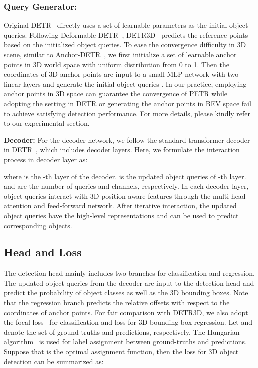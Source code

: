 \documentclass[runningheads]{llncs}
\begin{document}
\subsubsection{Query Generator:}
Original DETR~\cite{carion2020detr} directly uses a set of learnable parameters as the initial object queries. Following Deformable-DETR~\cite{zhu2020deformable}, DETR3D~\cite{wang2022detr3d} predicts the reference points based on the initialized object queries. To ease the convergence difficulty in 3D scene, similar to Anchor-DETR~\cite{wang2021anchor}, we first initialize a set of learnable anchor points in 3D world space with uniform distribution from 0 to 1. Then the coordinates of 3D anchor points are input to a small MLP network with two linear layers and generate the initial object queries . In our practice, employing anchor points in 3D space can guarantee the convergence of PETR while adopting the setting in DETR or generating the anchor points in BEV space fail to achieve satisfying detection performance. For more details, please kindly refer to our experimental section.

\noindent \textbf{Decoder:}
For the decoder network, we follow the standard transformer decoder in DETR~\cite{carion2020detr}, which includes  decoder layers. Here, we formulate the interaction process in decoder layer as:

where  is the -th layer of the decoder.  is the updated object queries of -th layer.  and  are the number of queries and channels, respectively. In each decoder layer, object queries interact with 3D position-aware features through the multi-head attention and feed-forward network. After iterative interaction, the updated object queries have the high-level representations and can be used to predict corresponding objects.

\subsection{Head and Loss} The detection head mainly includes two branches for classification and regression. The updated object queries from the decoder are input to the detection head and predict the probability of object classes as well as the 3D bounding boxes. 
Note that the regression branch predicts the relative offsets with respect to the coordinates of anchor points. For fair comparison with DETR3D, we also adopt the focal loss~\cite{lin2017focal} for classification and  loss for 3D bounding box regression. 
Let  and  denote the set of ground truths and predictions, respectively. The Hungarian algorithm~\cite{kuhn1955hungarian} is used for label assignment between ground-truths and predictions. Suppose that  is the optimal assignment function, then the loss for 3D object detection can be summarized as:
\end{document}
